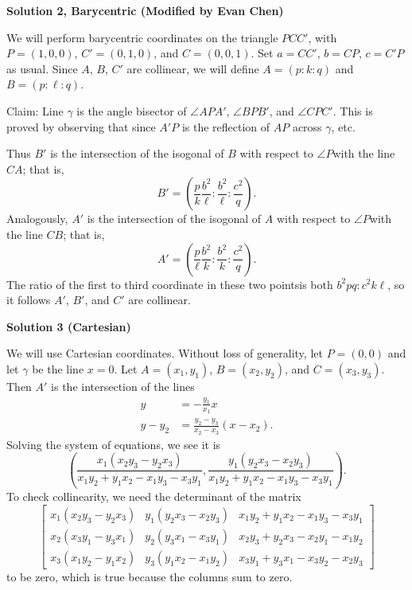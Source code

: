 \begin{enumerate}
\textbf{Solution 2, Barycentric (Modified by Evan Chen)}

We will perform barycentric coordinates on the triangle $PCC'$, with $P=(1,0,0)$, $C'=(0,1,0)$, and $C=(0,0,1)$. Set $a = CC'$, $b = CP$, $c = C'P$ as usual. Since $A$, $B$, $C'$ are collinear, we will define $A = (p : k : q)$ and $B = (p : \ell : q)$.

 Claim: Line $\gamma$ is the angle bisector of $\angle APA'$, $\angle BPB'$, and $\angle CPC'$. This is proved by observing that since $A'P$ is the reflection of $AP$ across $\gamma$, etc.

 Thus $B'$ is the intersection of the isogonal of $B$ with respect to $\angle P$with the line $CA$; that is,
 \[B' = \left( \frac pk \frac{b^2}{\ell}: \frac{b^2}{\ell} : \frac{c^2}{q} \right).\]Analogously, $A'$ is the intersection of the isogonal of $A$ with respect to $\angle P$with the line $CB$; that is,
 \[A' = \left( \frac{p}{\ell} \frac{b^2}{k} : \frac{b^2}{k} : \frac{c^2}{q} \right).\]The ratio of the first to third coordinate in these two pointsis both $b^2pq : c^2k\ell$, so it follows $A'$, $B'$, and $C'$ are collinear.

 



\textbf{Solution 3 (Cartesian)}

We will use Cartesian coordinates. Without loss of generality, let $P = (0,0)$ and let $\gamma$ be the line $x = 0$. Let $A = (x_1,y_1)$, $B = (x_2,y_2)$, and $C = (x_3,y_3)$. Then $A'$ is the intersection of the lines\begin{align*}y &= -\frac{y_1}{x_1}x \\y - y_2 &= \frac{y_2 - y_3}{x_2 - x_3}(x - x_2).\end{align*}
Solving the system of equations, we see it is
 \[\left(\frac{x_1(x_2y_3 - y_2x_3)}{x_1y_2 + y_1x_2 - x_1y_3 - x_3y_1},\frac{y_1(y_2x_3 - x_2y_3)}{x_1y_2 + y_1x_2 - x_1y_3 - x_3y_1}\right).\]To check collinearity, we need the determinant of the matrix
 \[\begin{bmatrix} x_1(x_2y_3 - y_2x_3) & y_1(y_2x_3 - x_2y_3) & x_1y_2 + y_1x_2 - x_1y_3 - x_3y_1 \\ x_2(x_3y_1 - y_3x_1) & y_2(y_3x_1 - x_3y_1) & x_2y_3 + y_2x_3 - x_2y_1 - x_1y_2 \\ x_3(x_1y_2 - y_1x_2) & y_3(y_1x_2 - x_1y_2) & x_3y_1 + y_3x_1 - x_3y_2 - x_2y_3 \end{bmatrix}\]to be zero, which is true because the columns sum to zero.

 




\end{enumerate}

